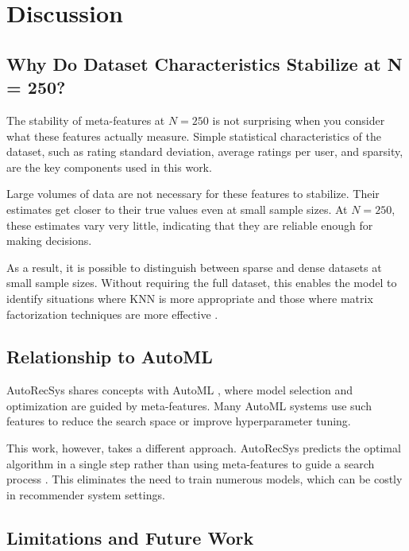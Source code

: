 \documentclass[conference]{IEEEtran}
\begin{document}
\section{Discussion}

\subsection{Why Do Dataset Characteristics Stabilize at N = 250?}

The stability of meta-features at $N = 250$ is not surprising when you consider what these features actually measure. Simple statistical characteristics of the dataset, such as rating standard deviation, average ratings per user, and sparsity, are the key components used in this work.

Large volumes of data are not necessary for these features to stabilize. Their estimates get closer to their true values even at small sample sizes. At $N = 250$, these estimates vary very little, indicating that they are reliable enough for making decisions.

As a result, it is possible to distinguish between sparse and dense datasets at small sample sizes. Without requiring the full dataset, this enables the model to identify situations where KNN is more appropriate and those where matrix factorization techniques are more effective \cite{cunha2018metalearning}.

\subsection{Relationship to AutoML}

AutoRecSys shares concepts with AutoML \cite{hutter2019automl}, where model selection and optimization are guided by meta-features. Many AutoML systems use such features to reduce the search space or improve hyperparameter tuning.

This work, however, takes a different approach. AutoRecSys predicts the optimal algorithm in a single step rather than using meta-features to guide a search process \cite{feurer2015autosklearn}. This eliminates the need to train numerous models, which can be costly in recommender system settings.

\subsection{Limitations and Future Work}
\end{document}
